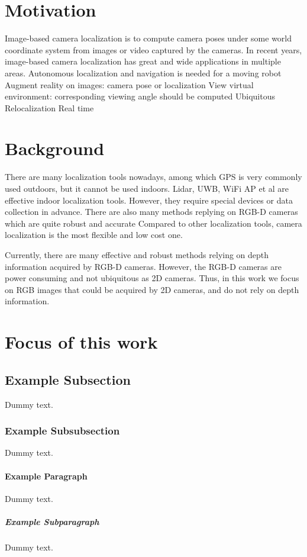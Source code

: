 \section{Motivation}

Image-based camera localization is to compute camera poses under some world coordinate system from images or video captured by the cameras. \cite{wu2018image} In recent years, image-based camera localization has great and wide applications in multiple areas. Autonomous localization and navigation is needed for a moving robot
Augment reality on images: camera pose or localization
View virtual environment: corresponding viewing angle should be computed
Ubiquitous
Relocalization
Real time


\section{Background}

There are many localization tools nowadays, among which GPS is very commonly used outdoors, but it cannot be used indoors. Lidar, UWB, WiFi AP et al are effective indoor localization tools. However, they require special devices or data collection in advance. There are also many methods replying on RGB-D cameras which are quite robust and accurate
Compared to other localization tools, camera localization is the most flexible and low cost one. 

Currently, there are many effective and robust methods relying on depth information acquired by RGB-D cameras. However, the RGB-D cameras are power consuming and not ubiquitous as 2D cameras. Thus, in this work we focus on RGB images that could be acquired by 2D cameras, and do not rely on depth information.

\section{Focus of this work}

\subsection{Example Subsection}

Dummy text.

\subsubsection{Example Subsubsection}

Dummy text.

\paragraph{Example Paragraph}

Dummy text.

\subparagraph{Example Subparagraph}

Dummy text.
